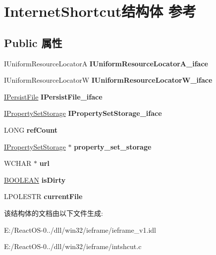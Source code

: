 \hypertarget{class_internet_shortcut}{}\section{Internet\+Shortcut结构体 参考}
\label{class_internet_shortcut}
\subsection*{Public 属性}
\begin{DoxyCompactItemize}
\item 
\mbox{\label{class_internet_shortcut_a30cdc80428d3c52929f782ef22f0cc84}} 
I\+Uniform\+Resource\+LocatorA {\bfseries I\+Uniform\+Resource\+Locator\+A\+\_\+iface}
\item 
\mbox{\label{class_internet_shortcut_a357cf30cd82219beeb02a427adfd555f}} 
I\+Uniform\+Resource\+LocatorW {\bfseries I\+Uniform\+Resource\+Locator\+W\+\_\+iface}
\item 
\mbox{\label{class_internet_shortcut_a0992fb805644f31306adfc7697f261b7}} 
\hyperlink{interface_i_persist_file}{I\+Persist\+File} {\bfseries I\+Persist\+File\+\_\+iface}
\item 
\mbox{\label{class_internet_shortcut_a601ce5a29773268de0eae7994e8dd556}} 
\hyperlink{interface_i_property_set_storage}{I\+Property\+Set\+Storage} {\bfseries I\+Property\+Set\+Storage\+\_\+iface}
\item 
\mbox{\label{class_internet_shortcut_a6c187eba7606629b872f869b0165c879}} 
L\+O\+NG {\bfseries ref\+Count}
\item 
\mbox{\label{class_internet_shortcut_a806c4cdcbcfb815928b9001f67712549}} 
\hyperlink{interface_i_property_set_storage}{I\+Property\+Set\+Storage} $\ast$ {\bfseries property\+\_\+set\+\_\+storage}
\item 
\mbox{\label{class_internet_shortcut_acfe2b7aad5a0416a559eaf59fa9beac1}} 
W\+C\+H\+AR $\ast$ {\bfseries url}
\item 
\mbox{\label{class_internet_shortcut_a4aa7c4ae74da222cb4b6e6ba36c61d92}} 
\hyperlink{_processor_bind_8h_a112e3146cb38b6ee95e64d85842e380a}{B\+O\+O\+L\+E\+AN} {\bfseries is\+Dirty}
\item 
\mbox{\label{class_internet_shortcut_ae43a186d94bc9c74f21a3088e00d0384}} 
L\+P\+O\+L\+E\+S\+TR {\bfseries current\+File}
\end{DoxyCompactItemize}


该结构体的文档由以下文件生成\+:\begin{DoxyCompactItemize}
\item 
E\+:/\+React\+O\+S-\/0../dll/win32/ieframe/ieframe\+\_\+v1.\+idl\item 
E\+:/\+React\+O\+S-\/0../dll/win32/ieframe/intshcut.\+c\end{DoxyCompactItemize}
